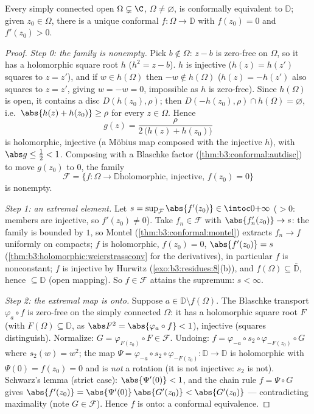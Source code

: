 \begin{theorem}
\label{thm:b3:conformal:rmt}
Every simply connected open $\Omega \subsetneq \C$, $\Omega
\neq \varnothing$, is conformally equivalent to $\mathbb D$;
given $z_0 \in \Omega$, there is a unique conformal $f \colon
\Omega \to \mathbb D$ with $f(z_0) = 0$ and $f'(z_0) >
0$.
\end{theorem}

\begin{proof}
\emph{Step 0: the family is nonempty.} Pick $b \notin \Omega$:
$z - b$ is zero-free on $\Omega$, so it has a holomorphic
square root $h$ ($h^2 = z - b$). $h$ is injective ($h(z) =
h(z')$ squares to $z = z'$), and if $w \in h(\Omega)$ then $-w
\notin h(\Omega)$ ($h(z) = -h(z')$ also squares to $z = z'$,
giving $w = -w = 0$, impossible as $h$ is zero-free). Since
$h(\Omega)$ is open, it contains a disc $D(h(z_0), \rho)$;
then $D(-h(z_0), \rho) \cap h(\Omega) = \varnothing$, i.e.\
$\abs{h(z) + h(z_0)} \geq \rho$ for every $z \in \Omega$.
Hence
\[
g(z) = \frac{\rho}{2\,\bigl(h(z) + h(z_0)\bigr)}
\]
is holomorphic, injective (a M\"obius map composed with the
injective $h$), with $\abs g \leq \frac12 < 1$. Composing with a Blaschke factor
(\cref{thm:b3:conformal:autdisc}) to move $g(z_0)$ to $0$, the
family
\[
\mathcal F = \{f \colon \Omega \to \mathbb D \text{
holomorphic, injective, } f(z_0) = 0\}
\]
is nonempty.

\emph{Step 1: an extremal element.} Let $s =
\sup_{\mathcal F}\abs{f'(z_0)} \in \intoc0{+\infty}$ ($> 0$:
members are injective, so $f'(z_0) \neq 0$). Take $f_n \in
\mathcal F$ with $\abs{f_n'(z_0)} \to s$: the family is
bounded by $1$, so Montel (\cref{thm:b3:conformal:montel})
extracts $f_n \to f$ uniformly on compacts; $f$ is
holomorphic, $f(z_0) = 0$, $\abs{f'(z_0)} = s$
(\cref{thm:b3:holomorphic:weierstrassconv} for the
derivatives), in particular $f$ is nonconstant; $f$ is
injective by Hurwitz (\cref{exo:b3:residues:8}(b)), and
$f(\Omega) \subseteq \bar{\mathbb D}$, hence $\subseteq
\mathbb D$ (open mapping). So $f \in \mathcal F$ attains the
supremum: $s < \infty$.

\emph{Step 2: the extremal map is onto.} Suppose $a \in
\mathbb D\setminus f(\Omega)$. The Blaschke transport
$\varphi_a\circ f$ is zero-free on the simply connected
$\Omega$: it has a holomorphic square root $F$ (with
$F(\Omega) \subseteq \mathbb D$, as $\abs F^2 =
\abs{\varphi_a\circ f} < 1$), injective (squares
distinguish). Normalize: $G = \varphi_{F(z_0)}\circ F \in
\mathcal F$. Undoing: $f = \varphi_{-a}\circ s_2 \circ
\varphi_{-F(z_0)}\circ G$ where $s_2(w) = w^2$; the map $\Psi
= \varphi_{-a}\circ s_2\circ\varphi_{-F(z_0)} \colon \mathbb D
\to \mathbb D$ is holomorphic with $\Psi(0) = f(z_0) = 0$ and
is \emph{not} a rotation (it is not injective: $s_2$ is not).
Schwarz's lemma (strict case): $\abs{\Psi'(0)} < 1$, and the
chain rule $f = \Psi\circ G$ gives $\abs{f'(z_0)} =
\abs{\Psi'(0)}\,\abs{G'(z_0)} < \abs{G'(z_0)}$ ---
contradicting maximality (note $G \in \mathcal F$). Hence $f$
is onto: a conformal equivalence.


\end{proof}
